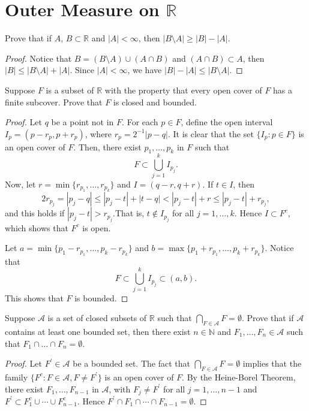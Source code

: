 \documentclass[14.5pt]{article}
\newcommand{\N}{\mathbb{N}}
\newcommand{\R}{\mathbb{R}}
\newenvironment{problem}[2][Problem]{\begin{mdframed}[backgroundcolor=gray!10, leftline = false, rightline=false, linewidth=0.25pt]  \begin{trivlist}
\item[\hskip \labelsep {\bfseries #1}\hskip \labelsep {\bfseries #2.}]}{\end{trivlist} \end{mdframed}  }
\begin{document}
\section*{Outer Measure on $\R$} %
\begin{problem}{2A.3}Prove that if $A$, $B \subset \R$ and $|A| < \infty$, then $|B\setminus A | \geq | B | - |A|$.
\end{problem}
\begin{proof}
    Notice that $B = (B \setminus A) \cup (A \cap B)$ and $(A \cap B) \subset A$, then $|B| \leq | B \setminus A | + |A|.$ Since $|A| < \infty$, we have $| B | - | A | \leq | B \setminus A|.$
\end{proof}

\begin{problem}{2A.4} Suppose $F$ is a subset of $\R$ with the property that every open cover of $F$ has a finite subcover. Prove that $F$ is closed and bounded.
\end{problem}
\begin{proof}
    Let $q$ be a point not in $F$. For each $p\in F$, define the open interval $I_p = (p - r_p, p + r_p)$, where $r_p = 2^{-1} | p - q |.$ It is clear that the set $\{I_p: p \in F\}$ is an open cover of $F$. Then, there exist ${p_1}, \ldots, {p_k}$ in $F$ such that 
    $$F \subset \bigcup_{j=1}^k I_{p_j}.$$
    Now, let $r = \min\{r_{p_1},\ldots, r_{p_k}\}$ and $I = (q - r, q + r)$. If $t \in I$, then
    $$2 r_{p_j} = |p_j - q | \leq |p_j - t | + | t - q| < |p_j - t | + r \leq |p_j - t | + r_{p_j},$$
    and this holds if $|p_j - t | > r_{p_j}$.That is, $t \notin I_{p_j}$ for all $j = 1, \ldots, k.$ Hence $I \subset F^c$, which shows that $F^c$ is open.
    
    Let $a = \min\{p_1 - r_{p_1}, \ldots, p_k - r_{p_k}\}$ and $b = \max\{p_1 + r_{p_1}, \ldots, p_k + r_{p_k}\}$. Notice that $$F \subset \bigcup_{j=1}^k I_{p_j} \subset (a, b).$$
    This shows that $F$ is bounded.
\end{proof}


\begin{problem}{2A.5}
    Suppose $\mathcal A $ is a set of closed subsets of $\R$ such that $\bigcap_{F \in \mathcal A} F = \emptyset$. Prove that if $\mathcal A$ contains at least one bounded set, then there exist $n \in \N$ and $F_1, \ldots, F_n \in \mathcal{A}$ such that $F_1 \cap \ldots \cap F_n = \emptyset.$
\end{problem}
\begin{proof}
    Let $F^\prime \in \mathcal{A}$ be a bounded set. The fact that  $\bigcap_{F \in \mathcal A} F = \emptyset$  implies that the family $\{F^c: F \in \mathcal A, F \neq F^\prime\}$ is an open cover of $F$. By the Heine-Borel Theorem, there exist $F_1, \ldots, F_{n-1}$ in $\mathcal{A}$, with $F_j \neq F^\prime$ for all $j =1, \ldots, n-1$ and
    $F^\prime \subset F_1^c \cup \cdots \cup F_{n-1}^c.$ Hence 
    $F^\prime \cap F_1 \cap \cdots \cap F_{n-1} = \emptyset.$
\end{proof}
\end{document}
